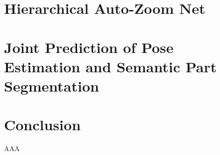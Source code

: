 \section{Hierarchical Auto-Zoom Net}
\label{sec:hazn}

\section{Joint Prediction of Pose Estimation and Semantic Part Segmentation}
\label{sec:pose_and_seg}

\section{Conclusion}

\begin{acknowledgements}
AAA
\end{acknowledgements}


